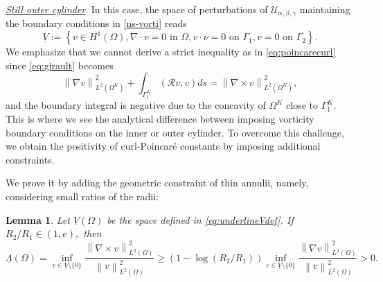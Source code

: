 \documentclass[a4paper,11pt]{amsart}
\newtheorem{lemma}{Lemma}[section]
\numberwithin{equation}{section}
\numberwithin{figure}{section}
\newcommand{\norm}[1]{\left \lVert #1 \right \rVert}
\begin{document}
\underline{\emph{Still outer cylinder}}. 
In this case, the space of perturbations of ${\mathcal{U}}_{\alpha,\beta,\gamma}$ maintaining the boundary conditions in \eqref{ns-vorti} reads 
\begin{equation}\label{eq:underlineVdef} 
\underline{V}:= \left\{v\in H^1(\Omega), \nabla\cdot v=0 \text{ in } \Omega, v\cdot \nu=0 \text{ on } \Gamma_1, v=0 \text{ on } \Gamma_2\right\}.
\end{equation}
We emphasize that we cannot derive a strict inequality as in \eqref{eq:poincarecurl} since \eqref{eq:girault} becomes
\begin{equation*}
	\norm{\nabla v}^2_{L^2(\Omega^K)}+\int_{\Gamma^K_1} (\mathcal{R}v,v)ds=\norm{\nabla\times v}^2_{L^2(\Omega^K)},
\end{equation*}
and the boundary integral is negative due to the concavity of $\Omega^K$ close to $\Gamma_1^K$. This is where we see the analytical difference between imposing vorticity boundary conditions on the inner or outer cylinder. To overcome this challenge, we obtain the positivity of curl-Poincaré constants by imposing additional constraints.\par 
We prove it by adding the geometric constraint of thin annulii, namely, considering small ratios of the radii:
	\begin{lemma}\label{lem:poincarecurlinner}
		Let $\underline{ V}(\Omega)$ be the space defined in \eqref{eq:underlineVdef}. If $ {R_2}/{R_1}\in (1,e),$ then
		\begin{equation}\label{eq:poincarecurlinner}
			{\underline{\Lambda}}(\Omega)=\inf_{v\in {\underline{V}}\setminus\{ 0\} }\frac{\norm{\nabla\times v}_{L^2(\Omega)}^2}{\norm{v}_{L^2(\Omega)}^2}\geq \left(1-\log\left(R_2/R_1\right)\right)  \inf_{v\in {\underline{V}}\setminus\{ 0\} }\frac{\norm{\nabla v}_{L^2(\Omega)}^2}{\norm{v}_{L^2(\Omega)}^2}>0.
		\end{equation}
	\end{lemma}
\end{document}
